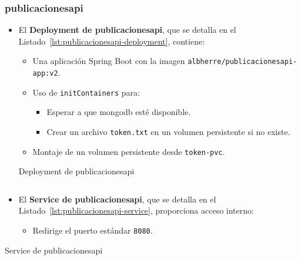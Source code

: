 \subsubsection*{publicacionesapi}
\begin{itemize}
  \item El \textbf{Deployment de publicacionesapi}, que se detalla en el Listado~\ref{lst:publicacionesapi-deployment}, contiene:
  \begin{itemize}
    \item Una aplicación Spring Boot con la imagen \texttt{albherre/publicacionesapi-app:v2}.
    \item Uso de \texttt{initContainers} para:
      \begin{itemize}
        \item Esperar a que \gls{mongodb} esté disponible.
        \item Crear un archivo \texttt{token.txt} en un volumen persistente si no existe.
      \end{itemize}
    \item Montaje de un volumen persistente desde \texttt{token-pvc}.
  \end{itemize}
  \begin{longlisting}
\caption{Deployment de publicacionesapi}
\inputminted[firstline=233,lastline=284]{yaml}{../backend/despliegue/kubernetes/despliegue.yaml}
\label{lst:publicacionesapi-deployment}
\end{longlisting}


  \item El \textbf{Service de publicacionesapi}, que se detalla en el Listado~\ref{lst:publicacionesapi-service}, proporciona acceso interno:
  \begin{itemize}
    \item Redirige el puerto estándar \texttt{8080}.
  \end{itemize}
\end{itemize}

\begin{longlisting}
\caption{Service de publicacionesapi}
\inputminted[firstline=288,lastline=298,fontsize=\small, breaklines, breakanywhere]{yaml}{../backend/despliegue/kubernetes/despliegue.yaml}
\label{lst:publicacionesapi-service}
\end{longlisting}

